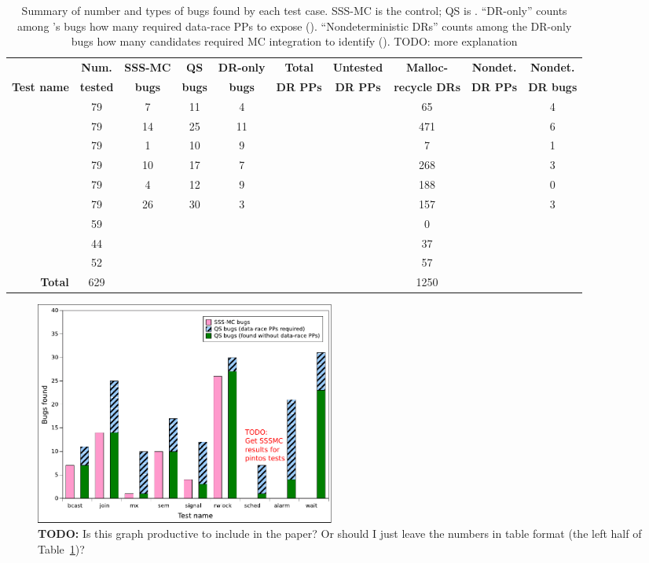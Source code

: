 
\begin{table}[t]
	\begin{center}
	\begin{tabular}{r|c||c|c|c||c|c|c|c|c}
		& {\bf Num.} & {\bf SSS-MC} & {\bf QS} & {\bf DR-only} & {\bf Total} & {\bf Untested} & {\bf Malloc-} & {\bf Nondet.} & {\bf Nondet.} \\
		{\bf Test name} & {\bf tested} & {\bf bugs} & {\bf bugs} & {\bf bugs} & {\bf DR PPs} & {\bf DR PPs} & {\bf recycle DRs} & {\bf DR PPs} & {\bf DR bugs} \\
		\hline
		{\bct		} & 79	& 7	& 11	& 4	&	&	& 65	&	& 4	\\
		{\tej		} & 79	& 14 	& 25	& 11	&	&	& 471	&	& 6	\\
		{\mxtest	} & 79	& 1	& 10	& 9	&	&	& 7	&	& 1	\\
		{\paradise	} & 79	& 10	& 17	& 7	&	&	& 268	&	& 3	\\
		{\paraguay	} & 79	& 4	& 12	& 9	&	&	& 188	&	& 0	\\
		{\rwldgr	} & 79	& 26	& 30	& 3	&	&	& 157	&	& 3	\\
		\hline
		{\prisema	} & 59	&	&	&	&	&	& 0	&	&	\\
		{\alarmsimul	} & 44	&	&	&	&	&	& 37	&	&	\\
		{\waitsimple	} & 52	&	&	&	&	&	& 57	&	&	\\
		\hline
		{\bf Total}	& 629	&	&	&	&	&	& 1250	&	&
	\end{tabular}
	\end{center}
	\caption{Summary of number and types of bugs found by each test case.
		SSS-MC is the control; QS is \quicksand.
		``DR-only'' counts among \quicksand's bugs how many required data-race PPs to expose (\sect{\ref{sec:eval-sssmc}}).
	``Nondeterministic DRs'' counts among the DR-only bugs how many candidates required MC integration to identify (\sect{\ref{sec:eval-falseneg}}).
		TODO: more explanation}
	\label{tab:drbugs}
\end{table}

\begin{figure}[t]
	\includegraphics[width=0.48\textwidth]{bargraph.pdf}
	\caption{{\bf TODO:} Is this graph productive to include in the paper? Or should I just leave the numbers in table format (the left half of Table~\ref{tab:drbugs})?}
	\label{fig:bargraph}
\end{figure}

